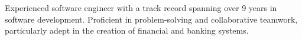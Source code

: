 

\begin{cvparagraph}

    Experienced software engineer with a track record spanning over 9 years in software development.
    Proficient in problem-solving and collaborative teamwork, particularly adept in the creation of financial and banking systems.
\end{cvparagraph}
